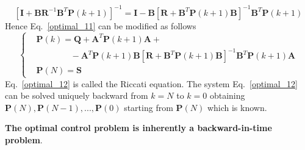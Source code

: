 \documentclass[11pt,a4paper,oneside]{book}
\numberwithin{equation}{section}
\theoremstyle{it}
\theoremstyle{definition}
\begin{document}
\begin{equation*}
	\left[ 
	\mathbf{I}+\mathbf{B}\mathbf{R}^{-1}\mathbf{B}^T\mathbf{P}(k+1)\right]^{-1} 
	= \mathbf{I} - \mathbf{B}\left[ 
	\mathbf{R}+\mathbf{B}^T\mathbf{P}(k+1)\mathbf{B}\right]^{-1}\mathbf{B}^T\mathbf{P}(k+1)
\end{equation*}
Hence Eq.~\eqref{optimal_11} can be modified as follows
\begin{equation}\label{optimal_12}
	\left\lbrace \begin{aligned}
		&\mathbf{P}(k) =\mathbf{Q}+\mathbf{A}^T\mathbf{P}(k+1)\mathbf{A}+ 
		\\[6pt]
		& \qquad\qquad -\mathbf{A}^T\mathbf{P}(k+1)\mathbf{B}\left[ 
		\mathbf{R}+\mathbf{B}^T\mathbf{P}(k+1)\mathbf{B}\right]^{-1}\mathbf{B}^T\mathbf{P}(k+1)
		\mathbf{A} \\[6pt]
		&\mathbf{P}(N) =\mathbf{S}
	\end{aligned}\right. 
\end{equation}
Eq.~\eqref{optimal_12} is called the Riccati equation. The system 
Eq.~\eqref{optimal_12} can be solved uniquely backward from $k=N$ to $k=0$ 
obtaining $\mathbf{P}(N), \mathbf{P}(N-1), ... ,\mathbf{P}(0)$ starting from 
$\mathbf{P}(N)$ which is known. 

\noindent\textbf{The optimal control problem is inherently a backward-in-time 
	problem}.
\end{document}
